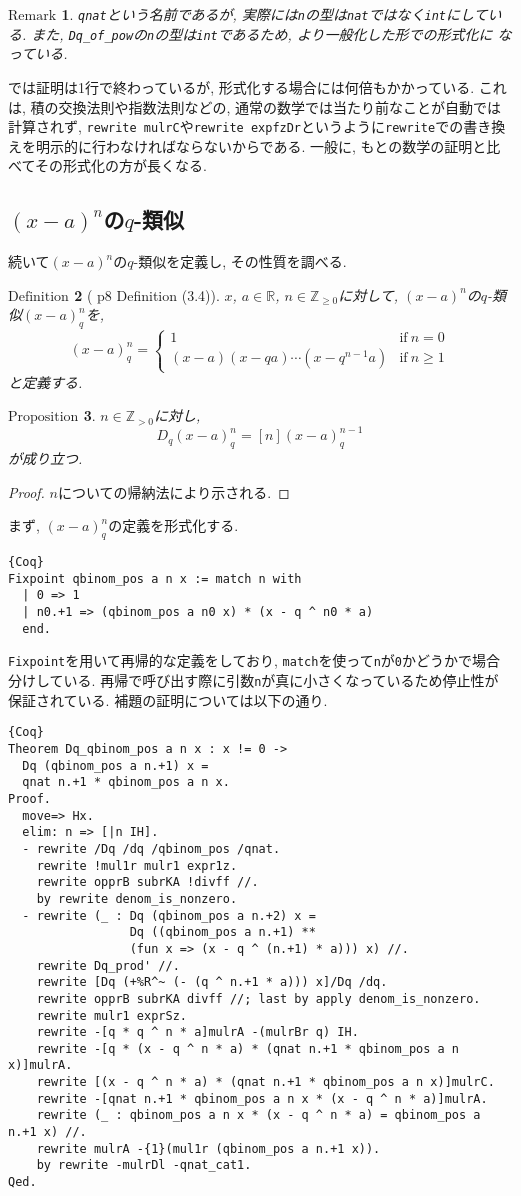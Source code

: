 \documentclass[11pt]{jsreport}
\theoremstyle{mystyle}
\newtheorem{df}{$\textrm{Definition}$}[subsection]
\newtheorem{prop}[df]{$\textrm{Proposition}$}
\newtheorem{rmk}[df]{$\textrm{Remark}$}
\newcommand{\bdf}{\begin{shadebox} \begin{df}}
\newcommand{\edf}{\end{df} \end{shadebox}}
\newcommand{\bprop}{\begin{shadebox} \begin{prop}}
\newcommand{\eprop}{\end{prop} \end{shadebox}}
\newcommand{\brmk}{\begin{rmk}}
\newcommand{\ermk}{\end{rmk}}
\newcommand{\bpf}{\begin{proof}}
\newcommand{\epf}{\end{proof}}
\newcommand{\Z}{\mathbb{Z}}
\newcommand{\R}{\mathbb{R}}
\newcommand{\0}{\textbf{0}}
\newcommand{\1}{\textbf{1}}
\newcommand{\2}{\textbf{2}}
\begin{document}
\brmk
  {\tt qnat}という名前であるが, 実際には{\tt n}の型は{\tt nat}ではなく{\tt int}にしている. 
  また, {\tt Dq\_of\_pow}の{\tt n}の型は{\tt int}であるため, より一般化した形での形式化に
  なっている. 
\ermk
\cite{Kac}では証明は1行で終わっているが, 形式化する場合には何倍もかかっている. これは, 積の交換法則や指数法則などの, 通常の数学では当たり前なことが自動では計算されず, {\tt rewrite mulrC}や{\tt rewrite expfzDr}というように{\tt rewrite}での書き換えを明示的に行わなければならないからである. 一般に, もとの数学の証明と比べてその形式化の方が長くなる. 
\subsection{$(x - a)^n$の$q$-類似}
続いて$(x - a)^n$の$q$-類似を定義し, その性質を調べる.  
\bdf[\cite{Kac} p8 Definition (3.4)]
  $x$, $a \in \R$, $n \in \Z_{\ge 0}$に対して, $(x - a)^n$の$q$-類似$(x - a)^n_q$を, 
  \[
  (x - a)^n_q = \begin{cases}
                      1 & \text{if}\ n = 0 \\
                      (x - a) (x - qa) \cdots (x - q^{n - 1} a) & \text{if}\ n \ge 1
                    \end{cases}
  \]
  と定義する. 
\edf
\bprop \label{Dq_qbinom_nonneg}
  $n\in\Z_{>0}$に対し, 
  \[
    D_q(x-a)^n_q = [n](x-a)^{n-1}_q
  \]
  が成り立つ. 
\eprop
\bpf
  $n$についての帰納法により示される. 
\epf
まず, $(x - a)^n_q$の定義を形式化する. 
\begin{lstlisting}{Coq}
Fixpoint qbinom_pos a n x := match n with
  | 0 => 1
  | n0.+1 => (qbinom_pos a n0 x) * (x - q ^ n0 * a)
  end. \end{lstlisting}
{\tt Fixpoint}を用いて再帰的な定義をしており, {\tt match}を使って{\tt n}が{\tt 0}かどうかで場合分けしている. 再帰で呼び出す際に引数{\tt n}が真に小さくなっているため停止性が保証されている. 補題の証明については以下の通り. 
\begin{lstlisting}{Coq}
Theorem Dq_qbinom_pos a n x : x != 0 ->
  Dq (qbinom_pos a n.+1) x =
  qnat n.+1 * qbinom_pos a n x.
Proof.
  move=> Hx.
  elim: n => [|n IH].
  - rewrite /Dq /dq /qbinom_pos /qnat.
    rewrite !mul1r mulr1 expr1z.
    rewrite opprB subrKA !divff //.
    by rewrite denom_is_nonzero.
  - rewrite (_ : Dq (qbinom_pos a n.+2) x =
                 Dq ((qbinom_pos a n.+1) **
                 (fun x => (x - q ^ (n.+1) * a))) x) //.
    rewrite Dq_prod' //.
    rewrite [Dq (+%R^~ (- (q ^ n.+1 * a))) x]/Dq /dq.
    rewrite opprB subrKA divff //; last by apply denom_is_nonzero.
    rewrite mulr1 exprSz.
    rewrite -[q * q ^ n * a]mulrA -(mulrBr q) IH.
    rewrite -[q * (x - q ^ n * a) * (qnat n.+1 * qbinom_pos a n x)]mulrA.
    rewrite [(x - q ^ n * a) * (qnat n.+1 * qbinom_pos a n x)]mulrC.
    rewrite -[qnat n.+1 * qbinom_pos a n x * (x - q ^ n * a)]mulrA.
    rewrite (_ : qbinom_pos a n x * (x - q ^ n * a) = qbinom_pos a n.+1 x) //.
    rewrite mulrA -{1}(mul1r (qbinom_pos a n.+1 x)).
    by rewrite -mulrDl -qnat_cat1.
Qed.
\end{lstlisting}
\end{document}
